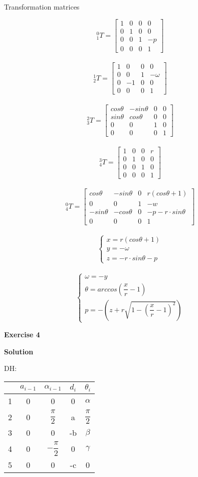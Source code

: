 \documentclass[12pt]{article}
\begin{document}
Transformation matrices

\[^0_{1}T=\left[
\begin{array}{cccc}
1 & 0 & 0 & 0 \\
0 & 1 & 0 & 0 \\
0 & 0 & 1 & -p\\
0 & 0 & 0 & 1
\end{array} \right]\]
\
\[^1_{2}T=\left[
\begin{array}{cccc}
1 & 0 & 0 & 0 \\
0 & 0 & 1 & -\omega \\
0 & -1 & 0 & 0\\
0 & 0 & 0 & 1
\end{array} \right]\]
\
\[^2_{3}T=\left[
\begin{array}{cccc}
cos\theta & -sin\theta & 0 & 0 \\
sin\theta & cos\theta & 0 & 0 \\
0 & 0 & 1 & 0\\
0 & 0 & 0 & 1
\end{array} \right]\] 
\
\[^3_{4}T=\left[
\begin{array}{cccc}
1 & 0 & 0 & r \\
0 & 1 & 0 & 0 \\
0 & 0 & 1 & 0\\
0 & 0 & 0 & 1
\end{array} \right]\] 
\
\[^0_{4}T=\left[
\begin{array}{cccc}
cos\theta & -sin\theta & 0 & r \left(cos\theta+1\right) \\
0 & 0 & 1 & -w \\
-sin\theta & -cos\theta & 0 & -p-r\cdot sin\theta\\
0 & 0 & 0 & 1
\end{array} \right]\] 
\ 
\[\left\{
\begin{array}{l}
x=r\left(cos\theta+1\right)\\
y=-\omega\\
z=-r\cdot sin\theta-p
\end{array} \right.\]
\ 
\[\left\{
\begin{array}{l}
\omega=-y\\
\theta=arccos\left(\dfrac{x}{r}-1\right)\\
p=-\left(z+r\sqrt{1-\left(\dfrac{x}{r}-1\right)^2}\right)
\end{array} \right.\]
\newpage

\textbf{Exercise 4}	
\newpage	
		
\textbf{Solution}

DH:
\\
\begin{tabular}{| c|c|c|c|c|}
\hline
 & $a_{i-1}$ & $\alpha_{i-1}$ & $d_i$ & $\theta_i$ \\
 \hline
 1 & 0 & 0 & 0 & $\alpha$ \\
 \hline
 2 & 0 & $\dfrac{\pi}{2}$ & a & $\dfrac{\pi}{2}$\\
 \hline
 3 & 0 & 0 & -b & $\beta$\\
 \hline
 4 & 0 & $-\dfrac{\pi}{2}$ & 0 & $\gamma$ \\
 \hline
 5 & 0 & 0 & -c & 0
\end{tabular}
\end{document}
